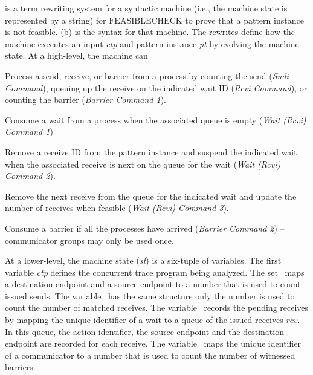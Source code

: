  is a term rewriting system for a syntactic
machine (i.e., the machine state is represented by a string) for
$\mathrm{FEASIBLECHECK}$ to prove that a pattern instance is not
feasible. (b) is the syntax for that machine. The
rewrites define how the machine executes an input \emph{ctp} and
pattern instance \emph{pt} by evolving the machine state. At a high-level, the machine can
\begin{compactitem}
\item Process a send, receive, or barrier from a process by counting the send (\emph{Sndi Command}), queuing up the receive on the indicated wait ID (\emph{Rcvi Command}), or counting the barrier (\emph{Barrier Command 1}).
\item Consume a wait from a process when the associated queue is empty (\emph{Wait (Rcvi) Command 1})
\item Remove a receive ID from the pattern instance and suspend the indicated wait when the associated receive is next on the queue for the wait (\emph{Wait (Rcvi) Command 2}).
\item Remove the next receive from the queue for the indicated wait and update the number of receives when feasible (\emph{Wait (Rcvi) Command 3}).
\item Consume a barrier if all the processes have arrived (\emph{Barrier Command 2}) -- communicator groups may only be used once.
\end{compactitem}
At a lower-level, the machine state (\textit{st}) is a six-tuple of variables. The first variable \textit{ctp} defines the concurrent trace program being analyzed. The set \epsnd\ maps a destination endpoint and a source endpoint to a number that is used to count issued sends. The variable \eprcv\ has the same structure only the number is used to count the number of matched receives. The variable \epwait\ records the pending receives by mapping the unique identifier of a wait to a queue of the issued receives $\mathit{rcv}$. 
In this queue, the action identifier, the source endpoint and the destination endpoint are recorded for each receive. The variable \epbarrier\ maps the unique identifier of a communicator to a number that is used to count the number of witnessed barriers.

